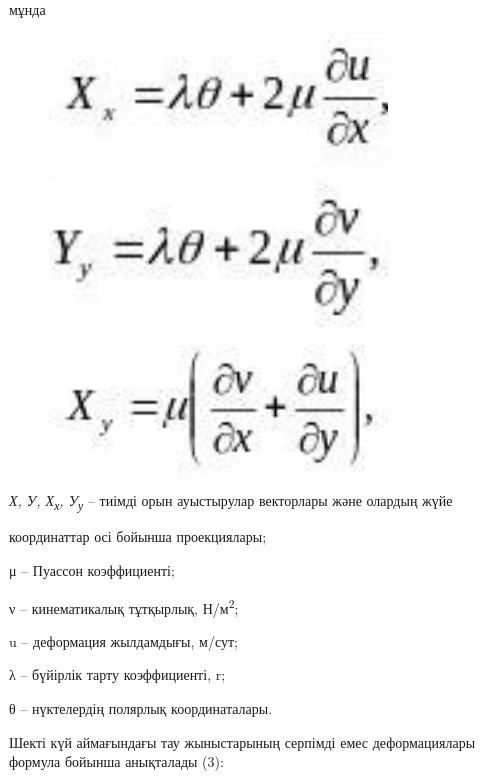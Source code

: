 мұнда \begin{figure}[H]
	\centering
	\includegraphics[width=0.8\textwidth]{assets/1267}
	\caption*{}
\end{figure}
\begin{figure}[H]
	\centering
	\includegraphics[width=0.8\textwidth]{assets/1268}
	\caption*{}
\end{figure}
\begin{figure}[H]
	\centering
	\includegraphics[width=0.8\textwidth]{assets/1269}
	\caption*{}
\end{figure}

\emph{Х, У, Х\textsubscript{х}, У\textsubscript{у}} -- тиімді орын
ауыстырулар векторлары және олардың жүйе

координаттар осі бойынша проекциялары;

μ -- Пуассон коэффициенті;

ν -- кинематикалық тұтқырлық, Н/м\textsuperscript{2};

u -- деформация жылдамдығы, м/сут;

λ -- бүйірлік тарту коэффициенті, r;

θ -- нүктелердің полярлық координаталары.

Шекті күй аймағындағы тау жыныстарының серпімді емес деформациялары
формула бойынша анықталады (3):


